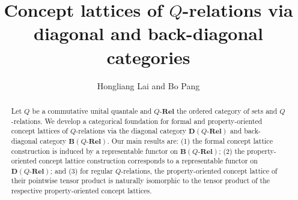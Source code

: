 \documentclass{tac}
\author{Hongliang Lai and Bo Pang}
\title{Concept lattices of $Q$-relations via diagonal and back-diagonal categories }
\begin{document}
\def\oto{{\bfig\morphism<180,0>[\mkern-4mu`\mkern-4mu;]\place(86,0)[\circ]\efig}}
\def\rto{{\bfig\morphism<180,0>[\mkern-4mu`\mkern-4mu;]\place(82,0)[\mapstochar]\efig}}
\def\nto{{\bfig\morphism<180,0>[\mkern-4mu`\mkern-4mu;]\place(86,0)[\shortmid]\efig}}

\newcommand{\ra}{\rightarrow}
\newcommand{\QRel}{Q\text{-}\mathbf{Rel}}
\newcommand{\stk}{{\star_\mathrm{k}}}
 
\newcommand{\op}{\mathrm{op}}
\newcommand{\rmd}{\mathrm{d}}
\newcommand{\rmk}{\mathrm{k}}
\newcommand{\odt}{{\,{\scriptstyle\odot}\,}}
\newcommand{\sigt}{{\{\star\}}}
\newcommand{\bbA}{\mathbb{A}}
\newcommand{\bbB}{\mathbb{B}}
\newcommand{\bbC}{\mathbb{C}}
\newcommand{\bbQ}{\mathbb{Q}}
\newcommand{\CP}{\mathcal{P}}
 
\newcommand{\DQRel}{{\mathbf{D}(Q\text{-}\mathbf{Rel})}}
\newcommand{\BQRel}{{\mathbf{B}(Q\text{-}\mathbf{Rel})}}
\newcommand{\frB}{\mathfrak{B}}
\newcommand{\frD}{\mathfrak{D}}
\newcommand{\Sup}{\mathbf{Sup}}
\newcommand{\QSup}{{Q\text{-}\mathbf{Sup}}}



\maketitle

\begin{abstract}
Let $Q$ be a commutative unital quantale and $\QRel$ the ordered category of sets and $Q$-relations. We develop a categorical foundation for formal and property-oriented concept lattices of $Q$-relations via the diagonal category $\DQRel$ and back-diagonal category $\BQRel$. Our main results are: (1) the formal concept lattice construction is induced by a representable functor on $\BQRel$; (2) the property-oriented concept lattice construction corresponds to a representable functor on $\DQRel$; and (3) for regular $Q$-relations, the property-oriented concept lattice of their pointwise tensor product is naturally isomorphic to the tensor product of the respective property-oriented concept lattices.
\end{abstract}
\end{document}
